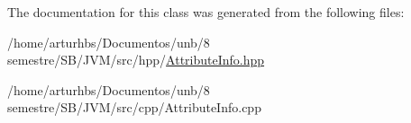 The documentation for this class was generated from the following files\+:\begin{DoxyCompactItemize}
\item 
/home/arturhbs/\+Documentos/unb/8 semestre/\+S\+B/\+J\+V\+M/src/hpp/\hyperlink{AttributeInfo_8hpp}{Attribute\+Info.\+hpp}\item 
/home/arturhbs/\+Documentos/unb/8 semestre/\+S\+B/\+J\+V\+M/src/cpp/Attribute\+Info.\+cpp\end{DoxyCompactItemize}
